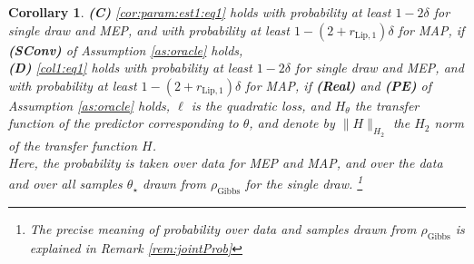 \documentclass{article}
\newtheorem{corollary}[theorem]{Corollary}
\begin{document}
\begin{corollary}
\textbf{(C)} \eqref{cor:param:est1:eq1} holds with probability at least $1-2\delta$ for single draw and MEP, and with probability at least $1-(2+r_{\text{Lip},1})\delta$ for MAP, 
if \textbf{(SConv)} of Assumption \ref{as:oracle} holds,  \\
\textbf{(D)} \eqref{col1:eq1} holds with probability at least $1-2\delta$ for single draw and MEP,
and with probability at least $1-(2+r_{\text{Lip},1})\delta$ for MAP,
if \textbf{(Real)} and \textbf{(PE)} of Assumption  \ref{as:oracle} holds, $\ell$ is the quadratic loss, and 
 $H_{\theta}$ the transfer function of the predictor  corresponding to $\theta$, and denote by $\|H\|_{H_2}$ the $H_2$ norm of the transfer function $H$. \\
% 
%
 Here, the probability is taken over data for MEP and MAP,  and over the data and over all samples $\theta_{\star}$ drawn from $\rho_{\mathrm{Gibbs}}$ for the single draw.
 \footnote{The precise meaning of probability over data and samples drawn from $\rho_{\mathrm{Gibbs}}$ is explained in Remark \ref{rem:jointProb}}


\end{corollary}
\end{document}
